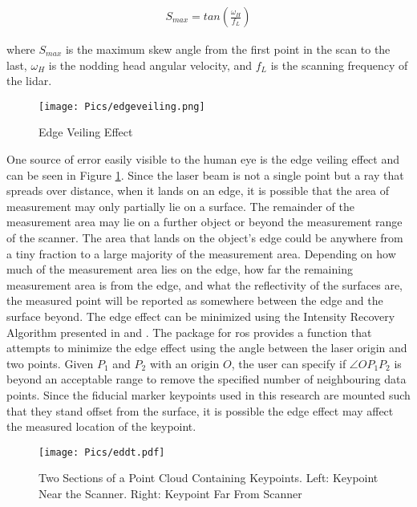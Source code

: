 \begin{align}
    S_{max} = tan\left(\frac{\omega_H}{f_L}\right)
\end{align}

where $S_{max}$ is the maximum skew angle from the first point in the scan to the last, $\omega_H$ is the nodding head angular velocity, and $f_L$ is the scanning frequency of the \acrshort{lidar}.\\

\begin{figure}[h]
    \centering
    \texttt{[image: Pics/edgeveiling.png]}
    \caption{Edge Veiling Effect}
    \label{fig:veiling}
\end{figure}

One source of error easily visible to the human eye is the edge veiling effect and can be seen in Figure \ref{fig:veiling}. Since the laser beam is not a single point but a ray that spreads over distance, when it lands on an edge, it is possible that the area of measurement may only partially lie on a surface. The remainder of the measurement area may lie on a further object or beyond the measurement range of the scanner. The area that lands on the object's edge could be anywhere from a tiny fraction to a large majority of the measurement area. Depending on how much of the measurement area lies on the edge, how far the remaining measurement area is from the edge, and what the reflectivity of the surfaces are, the measured point will be reported as somewhere between the edge and the surface beyond. The edge effect can be minimized using the Intensity Recovery Algorithm presented in \cite{bookbaredge} and \cite{theotherone}. The  package for \acrshort{ros} provides a  function that attempts to minimize the edge effect using the angle between the laser origin and two points. Given $P_1$ and $P_2$ with an origin $O$, the user can specify if $\angle OP_1P_2$ is beyond an acceptable range to remove the specified number of neighbouring data points. Since the fiducial marker keypoints used in this research are mounted such that they stand offset from the surface, it is possible the edge effect may affect the measured location of the keypoint.\\

\begin{figure}[h]
    \centering
    \texttt{[image: Pics/eddt.pdf]}
    \caption{Two Sections of a Point Cloud Containing Keypoints. Left: Keypoint Near the Scanner. Right: Keypoint Far From Scanner}
    \label{fig:keypointresolution}
\end{figure}

